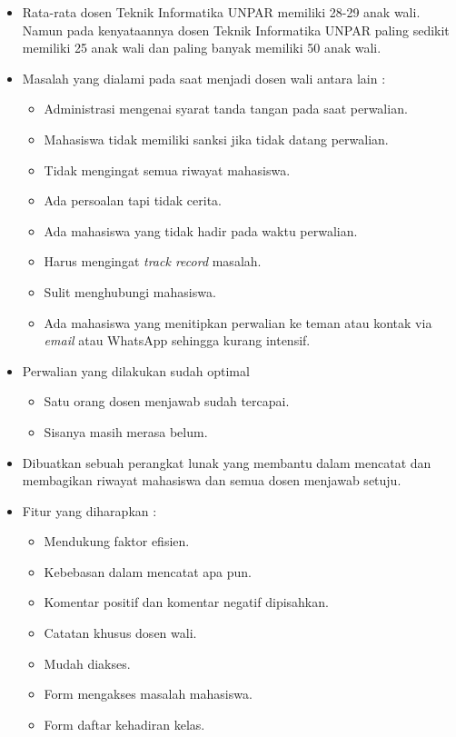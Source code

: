 \begin{itemize}
\item Rata-rata dosen Teknik Informatika UNPAR memiliki 28-29 anak wali. Namun pada kenyataannya dosen Teknik Informatika UNPAR paling sedikit memiliki 25 anak wali dan paling banyak memiliki 50 anak wali.
\item Masalah yang dialami pada saat menjadi dosen wali antara lain :
    \begin{itemize}
    \item Administrasi mengenai syarat tanda tangan pada saat perwalian.
    \item Mahasiswa tidak memiliki sanksi jika tidak datang perwalian.
    \item Tidak mengingat semua riwayat mahasiswa.
    \item Ada persoalan tapi tidak cerita.
    \item Ada mahasiswa yang tidak hadir pada waktu perwalian.
    \item Harus mengingat {\it track record} masalah.
    \item Sulit menghubungi mahasiswa.
    \item Ada mahasiswa yang menitipkan perwalian ke teman atau kontak via {\it email} atau WhatsApp sehingga kurang intensif.
    \end{itemize}
\item Perwalian yang dilakukan sudah optimal
    \begin{itemize}
    \item Satu orang dosen menjawab sudah tercapai.
    \item Sisanya masih merasa belum.
    \end{itemize}
\item Dibuatkan sebuah perangkat lunak yang membantu dalam mencatat dan membagikan riwayat mahasiswa dan semua dosen menjawab setuju.
\item Fitur yang diharapkan :
    \begin{itemize}
    \item Mendukung faktor efisien.
    \item Kebebasan dalam mencatat apa pun.
    \item Komentar positif dan komentar negatif dipisahkan.
    \item Catatan khusus dosen wali.
    \item Mudah diakses.
    \item Form mengakses masalah mahasiswa.
    \item Form daftar kehadiran kelas.
    \end{itemize}
\end{itemize}

